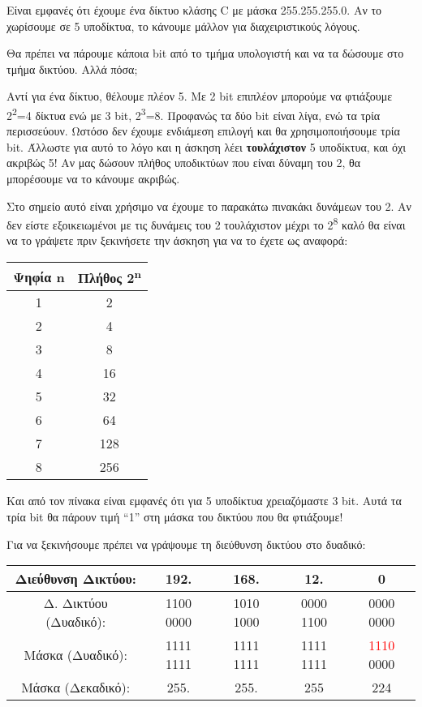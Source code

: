 Είναι εμφανές ότι έχουμε ένα δίκτυο κλάσης C με μάσκα 255.255.255.0. Αν το χωρίσουμε σε 5 υποδίκτυα, το κάνουμε μάλλον για διαχειριστικούς λόγους.

Θα πρέπει να πάρουμε κάποια bit από το τμήμα υπολογιστή και να τα δώσουμε στο τμήμα δικτύου. Αλλά πόσα;

Αντί για ένα δίκτυο, θέλουμε πλέον 5. Με 2 bit επιπλέον μπορούμε να φτιάξουμε 2\textsuperscript{2}=4 δίκτυα ενώ με 3 bit, 2\textsuperscript{3}=8. Προφανώς τα δύο bit είναι λίγα, ενώ τα τρία περισσεύουν. Ωστόσο δεν έχουμε ενδιάμεση επιλογή και θα χρησιμοποιήσουμε τρία bit. Άλλωστε για αυτό το λόγο και η άσκηση λέει \textbf{τουλάχιστον} 5 υποδίκτυα, και όχι ακριβώς 5! Αν μας δώσουν πλήθος υποδικτύων που είναι δύναμη του 2, θα μπορέσουμε να το κάνουμε ακριβώς.

Στο σημείο αυτό είναι χρήσιμο να έχουμε το παρακάτω πινακάκι δυνάμεων του 2. Αν δεν είστε εξοικειωμένοι με τις δυνάμεις του 2 τουλάχιστον μέχρι το 2\textsuperscript{8} καλό θα είναι να το γράψετε πριν ξεκινήσετε την άσκηση για να το έχετε ως αναφορά:

\begin{center}
\begin{tabular}{|c|c|}
\hline
 \textbf{Ψηφία n} & \textbf{Πλήθος 2\textsuperscript{n}} \\ 
\hline
 1 & 2\\
\hline
 2 & 4\\
 \hline
 3 & 8\\
 \hline
 4 & 16\\
 \hline 
 5 & 32\\
 \hline
 6 & 64\\
 \hline
 7 & 128\\
 \hline
 8 & 256\\
 \hline
\end{tabular}
\end{center}

Και από τον πίνακα είναι εμφανές ότι για 5 υποδίκτυα χρειαζόμαστε 3 bit. Αυτά τα τρία bit θα πάρουν τιμή ``1'' στη μάσκα του δικτύου που θα φτιάξουμε!

Για να ξεκινήσουμε πρέπει να γράψουμε τη διεύθυνση δικτύου στο δυαδικό:

\begin{center}
\fontsize{9}{11}
\ttfamily
\begin{tabular}{|c|c|c|c|c|}
\hline
 Διεύθυνση Δικτύου: & 192. & 168. & 12. & 0 \\ 
\hline
 Δ. Δικτύου (Δυαδικό): & 1100 0000 & 1010 1000 & 0000 1100 & 0000 0000\\
\hline
 Μάσκα (Δυαδικό): & 1111 1111 & 1111 1111 & 1111 1111 & \textcolor{red}{1110} 0000\\
 \hline
 Μάσκα (Δεκαδικό): & 255. & 255. & 255 & 224\\
 \hline 
\end{tabular}
\normalfont
\end{center}

